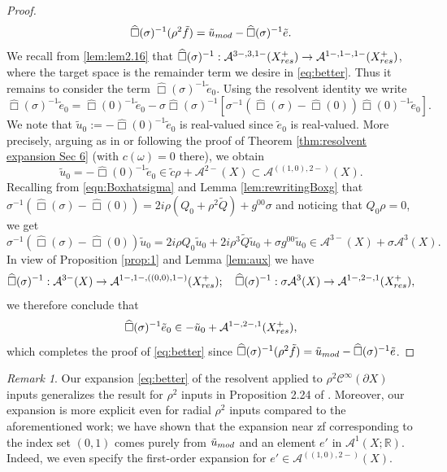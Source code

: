 \documentclass[10pt,a4paper,reqno]{amsart}
\newcommand{\CI}{\mathcal{C}^\infty}
\newcommand{\RR}{\mathbb{R}}
\newcommand{\A}{\mathcal{A}}
\newcommand{\ti}{\tilde}
\theoremstyle{definition}
\theoremstyle{remark}
\newtheorem{remark}[theorem]{Remark}
\numberwithin{equation}{section}
\newcommand{\wh}{\widehat}
\begin{document}
\begin{proof}
\[
    \wh\Box(\sigma)^{-1}(\rho^2 \ti f) = \ti u_{\rm mod} - \wh\Box(\sigma)^{-1} \ti e.
\]
We recall from \cref*{lem:lem2.16} that $\wh\Box(\sigma)^{-1}: \A^{3-,3,1-}(X_{\rm{res}}^+) \to \A^{1-,1-,1-}(X_{\rm{res}}^+)$, where the target space is the remainder term we desire in \eqref{eq:better}. Thus it remains to consider the term $\wh\Box(\sigma)^{-1} \ti e_0$. Using the resolvent identity we write
\[
	\wh\Box(\sigma)^{-1} \ti e_0 = \wh\Box(0)^{-1} \ti e_0 -\sigma\wh\Box(\sigma)^{-1} [\sigma^{-1}(\wh\Box(\sigma)-\wh\Box(0))\wh\Box(0)^{-1} \ti e_0 ].
\]
We note that $\ti u_0 := -\wh\Box(0)^{-1} \ti e_0$ is real-valued since $\ti e_0$ is real-valued. More precisely, arguing as in \cite[Lemma 3.2]{Hin22} or following the proof of Theorem \ref{thm:resolvent expansion Sec 6} (with $c(\omega)=0$ there), we obtain 
\begin{equation}
\label{eq:ti u_0}
    \ti u_0 = - \wh\Box(0)^{-1} \ti e_0 \in \ti c \rho + \A^{2-}(X) \subset \A^{((1,0),2-)}(X) .
\end{equation}
Recalling from \eqref{eqn:Boxhatsigma} and Lemma \ref{lem:rewritingBoxg} that $\sigma^{-1}(\wh\Box(\sigma)-\wh\Box(0)) = 2i\rho (Q_0+\rho^2 \widetilde{Q}) + g^{00}\sigma$ and noticing that $Q_0\rho = 0$, we get
\[
    \sigma^{-1}(\wh\Box(\sigma)-\wh\Box(0))\tilde{u}_0 = 2i\rho Q_0\tilde{u}_0 + 2i\rho^3\widetilde{Q}\tilde{u}_0 + \sigma g^{00}\tilde{u}_0 \in \A^{3-}(X) + \sigma\A^3(X) .
\]
In view of Proposition \ref{prop:1} and Lemma \ref{lem:aux} we have
\[
	\wh\Box(\sigma)^{-1}: \A^{3-}(X) \to \A^{1-,1-,((0,0),1-)}(X_{\rm{res}}^+);\quad
	\wh\Box(\sigma)^{-1}: \sigma\A^{3}(X) \to \A^{1-,2-,1}(X_{\rm{res}}^+),
\]
we therefore conclude that
\[
    \wh\Box(\sigma)^{-1} \ti e_0 \in -\ti u_0 + \A^{1-,2-,1}(X_{\rm{res}}^+),
\]
which completes the proof of \eqref{eq:better} since $\wh\Box(\sigma)^{-1}(\rho^2 \ti f) = \ti u_{\rm mod} - \wh\Box(\sigma)^{-1} \ti e$.
\end{proof}

\begin{remark}
Our expansion \eqref{eq:better} of the resolvent applied to $\rho^2\CI(\partial X)$ inputs generalizes the result for $\rho^2$ inputs in Proposition 2.24 of \cite{Hin22}. 
    Moreover, our expansion is more explicit even for radial $\rho^2$ inputs compared to the aforementioned work; we have shown that the expansion near zf corresponding to the index set $(0,1)$ comes purely from $\ti u_{\rm mod}$ and an element $e'$ in $\A^1(X;\RR)$. Indeed, we even specify the first-order expansion for $e'\in\A^{((1,0),2-)}(X)$.
\end{remark}
\end{document}
